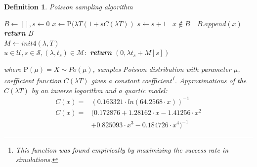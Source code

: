 \documentclass{llncs}
\newtheorem{mydef}{Definition}
\begin{document}
\begin{mydef}
Poisson sampling algorithm 


\begin{algorithmic}[1]
  \newcommand{\LineIf}[2]{ \State \algorithmicif\ {#1}\ \algorithmicthen\ {#2}}%
    \State $B\gets [], s \gets 0$
      \State $x\gets \text{P}(\lambda T (1+s C(\lambda T))$
      \State $s\gets s+1$
      \LineIf{$x \notin B$}{$B.append(x)$} %
    \EndWhile
    \State \textbf{return} $B$
   \EndFunction\\
    
   \State $M\gets init4(\lambda,T)$\\
   \State $u \in \mathcal{U}, s \in \mathcal{S}, (\lambda, t_s) \in \mathcal{M}:$
    \State \textbf{return} $(0, \lambda t_s + M[s])$
   \EndFunction
\end{algorithmic}
where $\text{P}(\mu) = X \sim Po(\mu)$, samples Poisson distribution with
parameter $\mu$, coefficient function $C(\lambda T)$ gives a constant 
coefficient\footnote{This function was found empirically by maximizing the success rate in simulations.}.
Approximations of the $C(\lambda T)$ by an inverse logarithm and a quartic model:
\begin{align*}
C(x) = & ({0.163321 \cdot  ln(64.2568 \cdot x)})^{-1}\\
C(x) = & (0.172876+1.28162\cdot x-1.41256\cdot x^2 \\
       & +0.825093\cdot x^3-0.184726\cdot x^4)^{-1}
\end{align*}
\end{mydef}
% 
\end{document}
